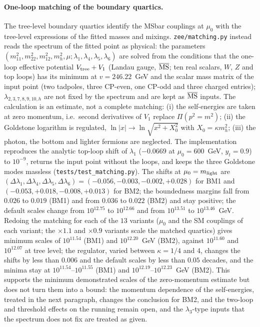 \documentclass[twocolumn,epjc3]{svjour3}
\begin{document}
\paragraph{One-loop matching of the boundary quartics.} The tree-level boundary quartics identify the MSbar couplings at $\mu_0$ with the tree-level expressions of the fitted masses and mixings. \texttt{zee/matching.py} instead reads the spectrum of the fitted point as physical: the parameters $(m_{11}^2,m_{22}^2,m_{12}^2,m_h^2,\mu;\lambda_1,\lambda_4,\lambda_5,\lambda_6)$ are solved from the conditions that the one-loop effective potential $V_{\rm tree}+V_1$ (Landau gauge, $\overline{\rm MS}$; ten real scalars, $W$, $Z$ and top loops) has its minimum at $v=246.22$~GeV and the scalar mass matrix of the input point (two tadpoles, three CP-even, one CP-odd and three charged entries); $\lambda_{2,3,7,8,9,10,h}$ are not fixed by the spectrum and are kept as $\overline{\rm MS}$ inputs. The calculation is an estimate, not a complete matching: (i) the self-energies are taken at zero momentum, i.e.\ second derivatives of $V_1$ replace $\Pi(p^2=m^2)$; (ii) the Goldstone logarithm is regulated, $\ln|x|\to\ln\sqrt{x^2+X_0^2}$ with $X_0=\kappa m_h^2$; (iii) the photon, the bottom and lighter fermions are neglected. The implementation reproduces the analytic top-loop shift of $\lambda_1$ ($-0.0669$ at $\mu_0=600$~GeV, $y_t=0.9$) to $10^{-9}$, returns the input point without the loops, and keeps the three Goldstone modes massless (\texttt{tests/test\_matching.py}). The shifts at $\mu_0=m_{\rm light}$ are $(\Delta\lambda_1,\Delta\lambda_4,\Delta\lambda_5,\Delta\lambda_6)=(-0.056,-0.003,-0.002,+0.028)$ for BM1 and $(-0.053,+0.018,-0.008,+0.013)$ for BM2; the boundedness margins fall from $0.026$ to $0.019$ (BM1) and from $0.036$ to $0.022$ (BM2) and stay positive; the default scales change from $10^{12.75}$ to $10^{12.66}$ and from $10^{13.51}$ to $10^{13.46}$~GeV. Redoing the matching for each of the $13$ variants ($\mu_0$ and the SM couplings of each variant; the $\times1.1$ and $\times0.9$ variants scale the matched quartics) gives minimum scales of $10^{11.54}$ (BM1) and $10^{12.20}$~GeV (BM2), against $10^{11.60}$ and $10^{12.07}$ at tree level; the regulator, varied between $\kappa=1/4$ and $4$, changes the shifts by less than $0.006$ and the default scales by less than $0.05$ decades, and the minima stay at $10^{11.54}$--$10^{11.55}$ (BM1) and $10^{12.19}$--$10^{12.23}$~GeV (BM2). This supports the minimum demonstrated scales of the zero-momentum estimate but does not turn them into a bound: the momentum dependence of the self-energies, treated in the next paragraph, changes the conclusion for BM2, and the two-loop and threshold effects on the running remain open, and the $\lambda_{3}$-type inputs that the spectrum does not fix are treated as given.
\end{document}
